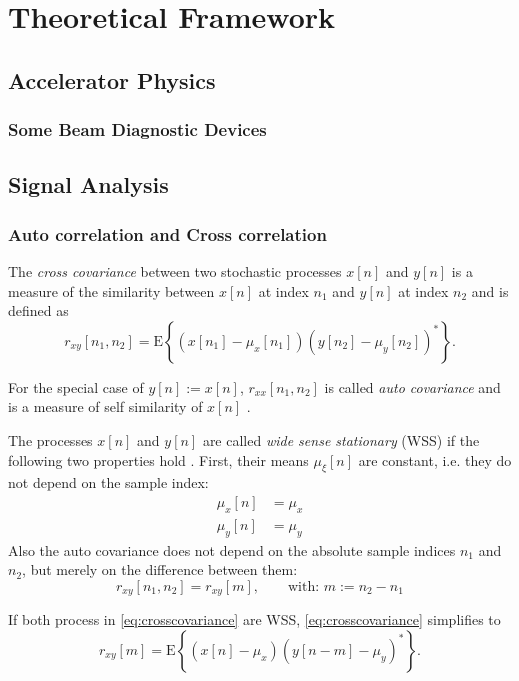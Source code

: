 \chapter{Theoretical Framework}
\section{Accelerator Physics}

\subsection{Some Beam Diagnostic Devices}

\section{Signal Analysis}
\subsection{Auto correlation and Cross correlation}
The \textit{cross covariance} between two stochastic processes $x[n]$ and $y[n]$ is a measure of the similarity between $x[n]$ at index $n_1$ and $y[n]$ at index $n_2$ and is defined as
\begin{equation}\label{eq:crosscovariance}
r_{xy}[n_1,n_2] = \text{E}\left\{(x[n_1]-\mu_x[n_1])(y[n_2]-\mu_y[n_2])^\ast\right\}.
\end{equation}

For the special case of $y[n]:=x[n]$, $r_{xx}[n_1,n_2]$ is called \textit{auto covariance} and is a measure of self similarity of $x[n]$ \cite[p.~172]{Park2017}.

The processes $x[n]$ and $y[n]$ are called \textit{wide sense stationary} (WSS) if the following two properties hold \cite[p.~167]{Park2017}. 
First, their means $\mu_{\xi}[n]$ are constant, i.e. they do not depend on the sample index:
\begin{align}
\mu_{x}[n] &= \mu_x\\
\mu_{y}[n] &= \mu_y
\end{align}
Also the auto covariance does not depend on the absolute sample indices $n_1$ and $n_2$, but merely on the difference between them:
\begin{equation}
r_{xy}[n_1,n_2] = r_{xy}[m],\qquad \text{with: } m:=n_2-n_1
\end{equation}

If both process in \autoref{eq:crosscovariance} are WSS, \autoref{eq:crosscovariance} simplifies to
\begin{equation}
r_{xy}[m] = \text{E}\left\{(x[n]-\mu_x)(y[n-m]-\mu_y)^\ast\right\}.
\end{equation}

